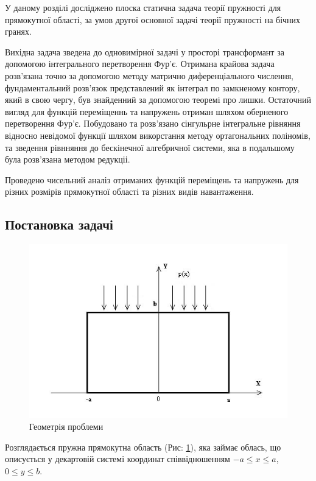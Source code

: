 У даному розділі досліджено плоска статична задача теорії пружності для прямокутної області,
за умов другої основної задачі теорії пружності на бічних гранях.

Вихідна задача зведена до одновимірної задачі у просторі трансформант за допомогою інтегрального перетворення Фур'є.
Отримана крайова задача розв'язана точно за допомогою методу матрично диференціального числення,
фундаментальний розв'язок представлений як інтеграл по замкненому контору, який в свою чергу, був знайденний за допомогою теоремі про лишки.
Остаточний вигляд для функцій переміщеннь та напружень отриман шляхом оберненого перетворення Фур'є.
Побудовано та розв'язано сінгульрне інтегральне рівняння відносно невідомої функції шляхом викорстання методу ортагональних поліномів, та зведення рівнняння до бескінечної алгебричної системи,
яка в подальшому була розв'язана методом редукціі.

Проведено чисельний аналіз отриманих функцій переміщень та напружень для різних розмірів прямокутної області та різних видів навантаження.

\subsection{Постановка задачі}
\begin{figure}[ht!]
    \begin{center}
        \includegraphics[scale=1]{images/geometry/image_1.jpg}
    \end{center}
    \caption{Геометрія проблеми}\label{geom_static_2}
\end{figure}
Розглядається пружна прямокутна область (Рис: \ref{geom_static_2}), яка займає облась,
що описується у декартовій системі координат співвідношенням $-a \le x \le a$, $0 \le y \le b$.

